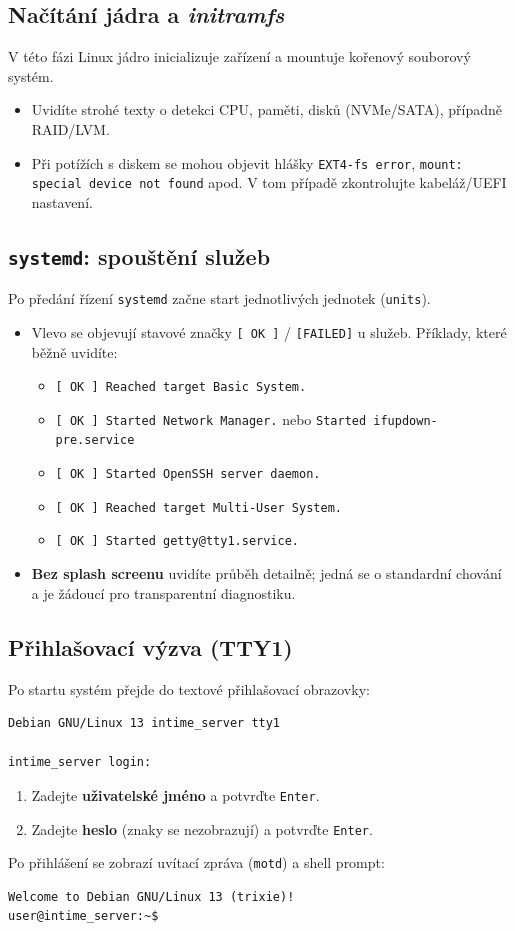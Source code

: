 \documentclass[11pt,a4paper]{book}
\begin{document}
\subsection{Načítání jádra a \emph{initramfs}}
V této fázi Linux jádro inicializuje zařízení a mountuje kořenový souborový systém.
\begin{itemize}
  \item Uvidíte strohé texty o detekci CPU, paměti, disků (NVMe/SATA), případně RAID/LVM.
  \item Při potížích s diskem se mohou objevit hlášky \texttt{EXT4-fs error}, \texttt{mount: special device not found} apod. V tom případě zkontrolujte kabeláž/UEFI nastavení.
\end{itemize}

\subsection{\texttt{systemd}: spouštění služeb}
Po předání řízení \texttt{systemd} začne start jednotlivých jednotek (\texttt{units}).
\begin{itemize}
  \item Vlevo se objevují stavové značky \texttt{[  OK  ]} / \texttt{[FAILED]} u služeb. Příklady, které běžně uvidíte:
  \begin{itemize}
    \item \texttt{[  OK  ] Reached target Basic System.}
    \item \texttt{[  OK  ] Started Network Manager.} \quad nebo \quad \texttt{Started ifupdown-pre.service}
    \item \texttt{[  OK  ] Started OpenSSH server daemon.}
    \item \texttt{[  OK  ] Reached target Multi-User System.}
    \item \texttt{[  OK  ] Started getty@tty1.service.}
  \end{itemize}
  \item \textbf{Bez splash screenu} uvidíte průběh detailně; jedná se o standardní chování a je žádoucí pro transparentní diagnostiku.
\end{itemize}

\subsection{Přihlašovací výzva (TTY1)}
Po startu systém přejde do textové přihlašovací obrazovky:
\begin{verbatim}
Debian GNU/Linux 13 intime_server tty1

intime_server login:
\end{verbatim}
\begin{enumerate}
  \item Zadejte \textbf{uživatelské jméno} a potvrďte \texttt{Enter}.
  \item Zadejte \textbf{heslo} (znaky se nezobrazují) a potvrďte \texttt{Enter}.
\end{enumerate}
Po přihlášení se zobrazí uvítací zpráva (\texttt{motd}) a shell prompt:
\begin{verbatim}
Welcome to Debian GNU/Linux 13 (trixie)!
user@intime_server:~$
\end{verbatim}
\end{document}
